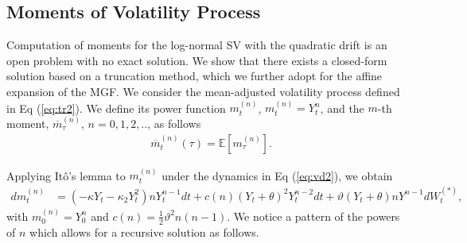 \documentclass[pdftex,11pt,a4paper] {article}
\begin{document}
\subsection{Moments of Volatility Process}
Computation of moments for the log-normal SV with the quadratic drift is an open problem with no exact solution. We show that there exists a closed-form solution based on a truncation method, which we further adopt for the affine expansion of the MGF. We consider the mean-adjusted volatility process defined in Eq (\ref{eq:tr2}). We define its power function $m^{(n)}_{t}$, $m^{(n)}_{t} = Y^{n}_{t} $, and the $m$-th moment, $\overline{m}^{(n)}_{\tau}$, $n=0,1,2,..$, as follows
\begin{equation}\label {eq:mvp1}
\begin{split}
& \overline{m}^{(n)}_{t}(\tau) = \mathbb{E}\left[m^{(n)}_{\tau}\right].
\end{split}
\end{equation}

Applying It\^{o}'s lemma to $m^{(n)}_{t}$ under the dynamics in Eq (\ref{eq:vd2}), we obtain
\begin{equation} \label{eq:mvp2}
\begin{split}
dm^{(n)}_{t}& =  \left(- \kappa Y_{t}   - \kappa_{2}Y^{2}_{t}\right)nY_{t}^{n-1}dt +c(n) \left(Y_{t}+\theta\right)^{2}Y_{t}^{n-2}dt  + \vartheta \left(Y_{t}+\theta\right)nY^{n-1} dW^{(*)}_{t},
\end{split}
\end{equation}
with $m^{(n)}_{0}=Y^{n}_{0}$ and $c(n)=\frac{1}{2} \vartheta^{2}n(n-1)$. We notice a pattern of the powers of $n$ which allows for a recursive solution as follows.
\end{document}
